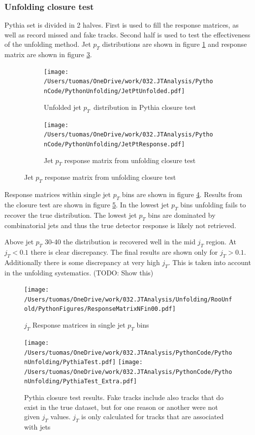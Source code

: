 \subsubsection{Unfolding  closure test}
Pythia set is divided in 2 halves. First is used to fill the response matrices, as well as record missed and fake tracks. Second half is used to test the effectiveness of the unfolding method. Jet $p_T$ distributions are shown in figure \ref{fig:jetptunf} and response matrix are shown in figure \ref{fig:jetptresponse}.
 
 \begin{figure}
\begin{subfigure}[b]{0.5\textwidth}
\texttt{[image: /Users/tuomas/OneDrive/work/032.JTAnalysis/PythonCode/PythonUnfolding/JetPtUnfolded.pdf]}
\caption{Unfolded jet $p_T$ distribution in Pythia closure test}
\label{fig:jetptunf}
\end{subfigure}
\begin{subfigure}[b]{0.5\textwidth}
\texttt{[image: /Users/tuomas/OneDrive/work/032.JTAnalysis/PythonCode/PythonUnfolding/JetPtResponse.pdf]} 
\caption{Jet $p_T$ response matrix from unfolding closure test}
\label{fig:jetptresponse}
\end{subfigure}
\end{figure}
 
Response matrices within single jet $p_T$ bins are shown in figure \ref{fig:response}. Results from the closure test are shown in figure \ref{fig:closure}. In the lowest jet $p_T$ bins unfolding fails to recover the true distribution. The lowest jet $p_T$ bins are dominated by combinatorial jets and thus the true detector response is likely not retrieved.

Above jet $p_T$ 30-40 \gev the distribution is recovered well in the mid $j_T$ region. At $j_T < 0.1$ there is clear discrepancy. The final results are shown only for $j_T > 0.1$. Additionally there is some discrepancy at very high $j_T$. This is taken into account in the unfolding systematics. (TODO: Show this)  
\begin{figure}
\texttt{[image: /Users/tuomas/OneDrive/work/032.JTAnalysis/Unfolding/RooUnfold/PythonFigures/ResponseMatrixNFin00.pdf]}
\caption{$j_T$ Response matrices in single jet $p_T$ bins}
\label{fig:response}
\end{figure}

\begin{figure}
\texttt{[image: /Users/tuomas/OneDrive/work/032.JTAnalysis/PythonCode/PythonUnfolding/PythiaTest.pdf]}
\texttt{[image: /Users/tuomas/OneDrive/work/032.JTAnalysis/PythonCode/PythonUnfolding/PythiaTest\_Extra.pdf]}
\caption{Pythia closure test results. Fake tracks include also tracks that do exist in the true dataset, but for one reason or another were not given $j_T$ values. $j_T$ is only calculated for tracks that are associated with jets}
\label{fig:closure}
\end{figure}


